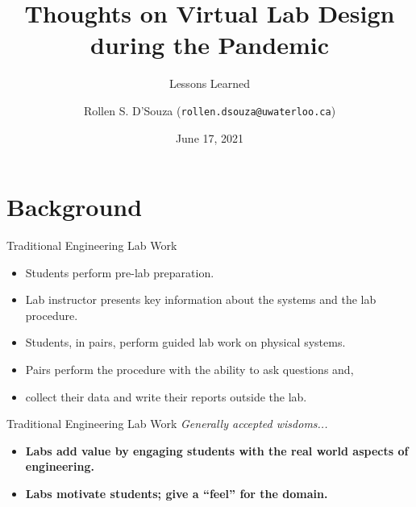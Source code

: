 \documentclass{beamer}
\title[Virtual Lab Design and Lessons Learned]{%
  Thoughts on Virtual Lab Design during the Pandemic
}
\subtitle{Lessons Learned}
\author[R. S. D'Souza --- rollen.dsouza@uwaterloo.ca]{%
  Rollen S. D'Souza (\texttt{rollen.dsouza@uwaterloo.ca})
}
\date{June 17, 2021}
\begin{document}
\frame{\titlepage}

\section{Background}

\begin{frame}{Traditional Engineering Lab Work}
  \begin{itemize}
    \item{
      Students perform pre-lab preparation.
    }
    \item{
      Lab instructor presents key information about the systems and the lab procedure.
    }
    \item{
      Students, in pairs, perform guided lab work on physical systems.
    }
    \item{
      Pairs perform the procedure with the ability to ask questions and,
    }
    \item{
      collect their data and write their reports outside the lab.
    }
  \end{itemize}
\end{frame}

\begin{frame}{Traditional Engineering Lab Work}
  \emph{Generally accepted wisdoms...}
  \begin{itemize}
    \item{
      \textbf{
        Labs add value by engaging students with the real world aspects of engineering.
      }
    }
    \pause
    \item{
      \textbf{
        Labs motivate students; give a ``feel'' for the domain.
      }
    }
  \end{itemize}
\end{frame}
\end{document}
